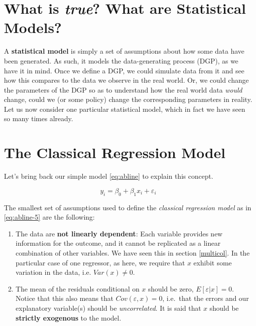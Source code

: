 \documentclass[]{book}
\providecommand{\tightlist}{%
  \setlength{\itemsep}{0pt}\setlength{\parskip}{0pt}}
\begin{document}
\section{\texorpdfstring{What is \emph{true}? What are Statistical
Models?}{What is true? What are Statistical Models?}}\label{what-is-true-what-are-statistical-models}

A \textbf{statistical model} is simply a set of assumptions about how
some data have been generated. As such, it models the data-generating
process (DGP), as we have it in mind. Once we define a DGP, we could
simulate data from it and see how this compares to the data we observe
in the real world. Or, we could change the parameters of the DGP so as
to understand how the real world data \emph{would} change, could we (or
some policy) change the corresponding parameters in reality. Let us now
consider one particular statistical model, which in fact we have seen so
many times already.

\section{The Classical Regression Model}\label{class-reg}

Let's bring back our simple model \eqref{eq:abline} to explain this
concept.

\begin{equation}
y_i = \beta_0 + \beta_1 x_i + \varepsilon_i \label{eq:abline-5}
\end{equation}

The smallest set of assumptions used to define the \emph{classical
regression model} as in \eqref{eq:abline-5} are the following:

\begin{enumerate}
\def\labelenumi{\arabic{enumi}.}
\tightlist
\item
  The data are \textbf{not linearly dependent}: Each variable provides
  new information for the outcome, and it cannot be replicated as a
  linear combination of other variables. We have seen this in section
  \ref{multicol}. In the particular case of one regressor, as here, we
  require that \(x\) exhibit some variation in the data, i.e.
  \(Var(x)\neq 0\).
\item
  The mean of the residuals conditional on \(x\) should be zero,
  \(E[\varepsilon|x] = 0\). Notice that this also means that
  \(Cov(\varepsilon,x) = 0\), i.e.~that the errors and our explanatory
  variable(s) should be \emph{uncorrelated}. It is said that \(x\)
  should be \textbf{strictly exogenous} to the model.
\end{enumerate}
\end{document}

